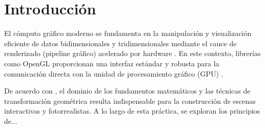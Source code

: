 
\section{Introducción}

El cómputo gráfico moderno se fundamenta en la manipulación y visualización eficiente de datos bidimensionales y tridimensionales mediante el cauce de renderizado (pipeline gráfico) acelerado por hardware \cite{hearn_baker}. En este contexto, librerías como OpenGL proporcionan una interfaz estándar y robusta para la comunicación directa con la unidad de procesamiento gráfico (GPU) \cite{khronos_opengl}.

De acuerdo con \cite{teodoro_vite}, el dominio de los fundamentos matemáticos y las técnicas de transformación geométrica resulta indispensable para la construcción de escenas interactivas y fotorrealistas. A lo largo de esta práctica, se exploran los principios de...

